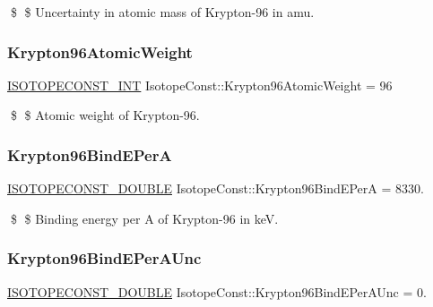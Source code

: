 \$ \$ Uncertainty in atomic mass of Krypton-\/96 in amu. \mbox{\label{group___isotope_const-_krypton-_kr96_ga7329bb9232df3b77d9b003c67cfd0d58}} 
\subsubsection{\texorpdfstring{Krypton96\+Atomic\+Weight}{Krypton96AtomicWeight}}
{\footnotesize\ttfamily \mbox{\hyperlink{group___isotope_const-_macros_ga5f18360b3e99483a35c32d789e62621c}{I\+S\+O\+T\+O\+P\+E\+C\+O\+N\+S\+T\+\_\+\+I\+NT}} Isotope\+Const\+::\+Krypton96\+Atomic\+Weight = 96}

\$ \$ Atomic weight of Krypton-\/96. \mbox{\label{group___isotope_const-_krypton-_kr96_ga5efdb46cd902ee2fde4b87f4d894f8fb}} 
\subsubsection{\texorpdfstring{Krypton96\+Bind\+E\+PerA}{Krypton96BindEPerA}}
{\footnotesize\ttfamily \mbox{\hyperlink{group___isotope_const-_macros_ga8f45a7272ce02c0b4c65c44636ed719a}{I\+S\+O\+T\+O\+P\+E\+C\+O\+N\+S\+T\+\_\+\+D\+O\+U\+B\+LE}} Isotope\+Const\+::\+Krypton96\+Bind\+E\+PerA = 8330.}

\$ \$ Binding energy per A of Krypton-\/96 in keV. \mbox{\label{group___isotope_const-_krypton-_kr96_ga19c4abf73df1f036bf3e9c396c1a7410}} 
\subsubsection{\texorpdfstring{Krypton96\+Bind\+E\+Per\+A\+Unc}{Krypton96BindEPerAUnc}}
{\footnotesize\ttfamily \mbox{\hyperlink{group___isotope_const-_macros_ga8f45a7272ce02c0b4c65c44636ed719a}{I\+S\+O\+T\+O\+P\+E\+C\+O\+N\+S\+T\+\_\+\+D\+O\+U\+B\+LE}} Isotope\+Const\+::\+Krypton96\+Bind\+E\+Per\+A\+Unc = 0.}

